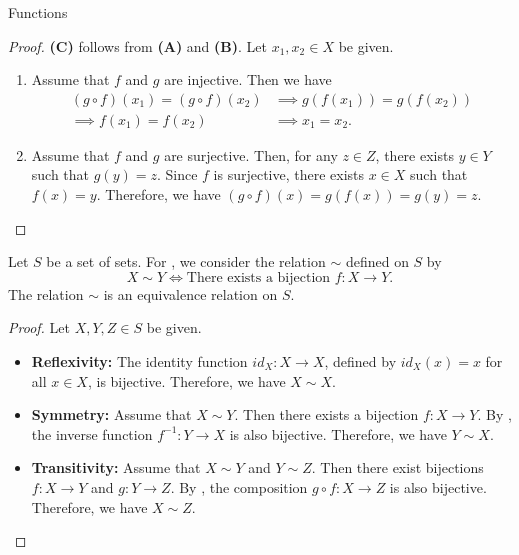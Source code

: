 \begin{section}{Functions}
\begin{proof}
    \textbf{(C)} follows from \textbf{(A)} and \textbf{(B)}. Let $x_1, x_2 \in X$ be given.
    \begin{enumerate}[label=\textbf{(\Alph*)}]
        \item Assume that $f$ and $g$ are injective. Then we have
        \begin{align*}
        (g \circ f)(x_1) = (g \circ f)(x_2) &\implies g(f(x_1)) = g(f(x_2)) \\
        \implies f(x_1) = f(x_2) &\implies x_1 = x_2.
        \end{align*}
        \item Assume that $f$ and $g$ are surjective. Then, for any $z \in Z$, there exists $y \in Y$ such that
        $g(y) = z$. Since $f$ is surjective, there exists $x \in X$ such that $f(x) = y$. Therefore, we have
        $(g \circ f)(x) = g(f(x)) = g(y) = z$.
    \end{enumerate}
\end{proof}

\begin{theorem} \label{thm:BijectionEquivalenceRelation}
    Let $S$ be a set of sets. For ,
    we consider the relation $\hyperref[thm:BijectionEquivalenceRelation]{\sim}$ defined on $S$ by
    \[
    X \hyperref[thm:BijectionEquivalenceRelation]{\sim} Y \iff \text{There exists a bijection } f: X \to Y.
    \]
    The relation $\hyperref[thm:BijectionEquivalenceRelation]{\sim}$ is an equivalence relation on $S$.
\end{theorem}

\begin{proof}
    Let $X, Y, Z \in S$ be given.
    \begin{itemize}
        \item \textbf{Reflexivity:} The identity function $id_{X}: X \to X$, defined by $id_{X}(x) = x$ for all $x \in X$,
        is bijective. Therefore, we have $X \hyperref[thm:BijectionEquivalenceRelation]{\sim} X$.
        \item \textbf{Symmetry:} Assume that $X \hyperref[thm:BijectionEquivalenceRelation]{\sim} Y$. Then there exists
        a bijection $f: X \to Y$. By , the inverse function
        $f^{-1}: Y \to X$ is also bijective. Therefore, we have $Y \hyperref[thm:BijectionEquivalenceRelation]{\sim} X$.
        \item \textbf{Transitivity:} Assume that $X \hyperref[thm:BijectionEquivalenceRelation]{\sim} Y$
        and $Y \hyperref[thm:BijectionEquivalenceRelation]{\sim} Z$. Then there exist bijections
        $f: X \to Y$ and $g: Y \to Z$. By , the composition
        $g \circ f: X \to Z$ is also bijective. Therefore, we have $X \hyperref[thm:BijectionEquivalenceRelation]{\sim} Z$.
    \end{itemize}
\end{proof}

\end{section}